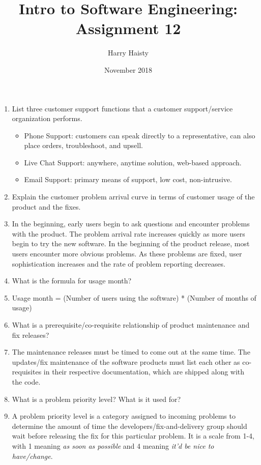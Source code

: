 \documentclass{article}
\title{Intro to Software Engineering: Assignment 12}
\author{Harry Haisty}
\date{November 2018}
\begin{document}
\maketitle

\begin{enumerate}
    \item List three customer support functions that a customer support/service organization performs.
    \begin{itemize}
        \item Phone Support: customers can speak directly to a representative, can also place orders, troubleshoot, and upsell.
        \item Live Chat Support: anywhere, anytime solution, web-based approach.
        \item Email Support: primary means of support, low cost, non-intrusive. 
    \end{itemize}
    
    \item Explain the customer problem arrival curve in terms of customer usage of the product and the fixes.
   \item[] In the beginning, early users begin to ask questions and encounter problems with the product. The problem arrival rate increases quickly as more users begin to try the new software. In the beginning of the product release, most users encounter more obvious problems. As these problems are fixed, user sophistication increases and the rate of problem reporting decreases.
    
    \item What is the formula for usage month?
    \item[] Usage month = (Number of users using the software) * (Number of months of usage)
    
    \item What is a prerequisite/co-requisite relationship of product maintenance and fix releases?
    \item[] The maintenance releases must be timed to come out at the same time. The updates/fix maintenance of the software products must list each other as co-requisites in their respective documentation, which are shipped along with the code. 
    \item What is a problem priority level? What is it used for?
    \item[] A problem priority level is a category assigned to incoming problems to determine the amount of time the developers/fix-and-delivery group should wait before releasing the fix for this particular problem. It is a scale from 1-4, with 1 meaning \textit{as soon as possible} and 4 meaning \textit{it'd be nice to have/change}.
    

\end{enumerate}
\end{document}
